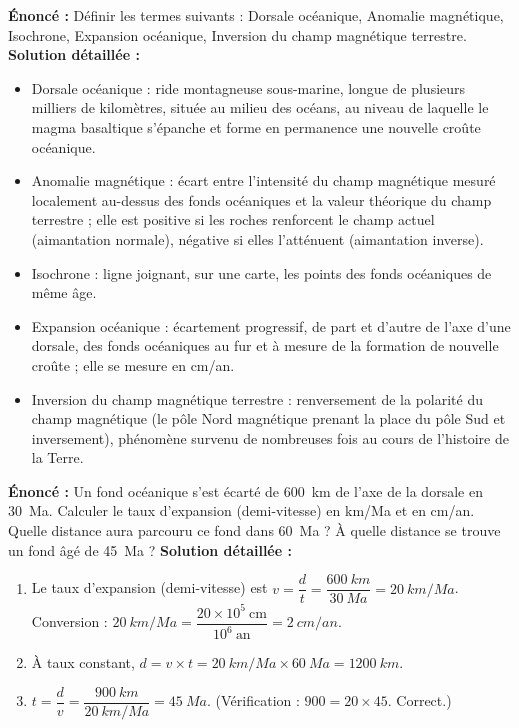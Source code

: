 \documentclass[11pt]{article}
\newcommand{\cle}[1]{{\popxbold\color{popdark}#1}}
\begin{document}
\begin{corrige}
\textbf{Énoncé :} Définir les termes suivants : Dorsale océanique, Anomalie magnétique, Isochrone, Expansion océanique, Inversion du champ magnétique terrestre.
\tcblower
\textbf{Solution détaillée :}
\begin{itemize}
\item \cle{Dorsale océanique} : ride montagneuse sous-marine, longue de plusieurs milliers de kilomètres, située au milieu des océans, au niveau de laquelle le magma basaltique s'épanche et forme en permanence une nouvelle croûte océanique.
\item \cle{Anomalie magnétique} : écart entre l'intensité du champ magnétique mesuré localement au-dessus des fonds océaniques et la valeur théorique du champ terrestre ; elle est positive si les roches renforcent le champ actuel (aimantation normale), négative si elles l'atténuent (aimantation inverse).
\item \cle{Isochrone} : ligne joignant, sur une carte, les points des fonds océaniques de même âge.
\item \cle{Expansion océanique} : écartement progressif, de part et d'autre de l'axe d'une dorsale, des fonds océaniques au fur et à mesure de la formation de nouvelle croûte ; elle se mesure en cm/an.
\item \cle{Inversion du champ magnétique terrestre} : renversement de la polarité du champ magnétique (le pôle Nord magnétique prenant la place du pôle Sud et inversement), phénomène survenu de nombreuses fois au cours de l'histoire de la Terre.
\end{itemize}
\end{corrige}

\begin{corrige}
\textbf{Énoncé :} Un fond océanique s'est écarté de \SI{600}{km} de l'axe de la dorsale en \SI{30}{Ma}. Calculer le taux d'expansion (demi-vitesse) en km/Ma et en cm/an. Quelle distance aura parcouru ce fond dans \SI{60}{Ma} ? À quelle distance se trouve un fond âgé de \SI{45}{Ma} ?
\tcblower
\textbf{Solution détaillée :}
\begin{enumerate}
\item Le taux d'expansion (demi-vitesse) est $v = \dfrac{d}{t} = \dfrac{\SI{600}{km}}{\SI{30}{Ma}} = \SI{20}{km/Ma}$.
Conversion : $\SI{20}{km/Ma} = \dfrac{20 \times 10^{5}\ \text{cm}}{10^{6}\ \text{an}} = \SI{2}{cm/an}$.
\item À taux constant, $d = v \times t = \SI{20}{km/Ma} \times \SI{60}{Ma} = \SI{1200}{km}$.
\item $t = \dfrac{d}{v} = \dfrac{\SI{900}{km}}{\SI{20}{km/Ma}} = \SI{45}{Ma}$. (Vérification : $900 = 20 \times 45$. Correct.)
\end{enumerate}
\end{corrige}
\end{document}
